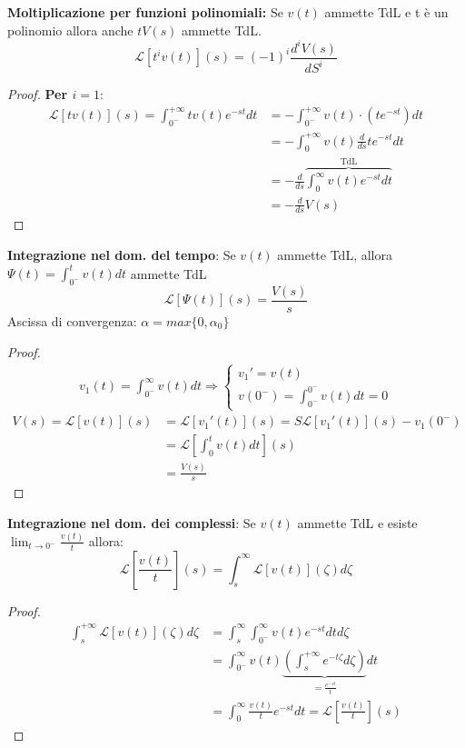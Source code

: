 \documentclass[a4paper]{article}
\begin{document}
\begin{property}
    \label{prop:molt_funz_pol}
    \textbf{Moltiplicazione per funzioni polinomiali:} Se $v(t)$ ammette TdL e t è un polinomio allora anche $tV(s)$ ammette TdL.
    \[\mathcal{L}[t^iv(t)](s) = (-1)^i\frac{d^iV(s)}{dS^i}\]
\end{property}
\begin{proof}
    \textbf{Per $i = 1$}: 
    \begin{align*}
        \mathcal{L}[tv(t)](s) = \int_{0^-}^{+\infty} tv(t)e^{-st}dt &= -\int_{0^-}^{+\infty}v(t) \cdot (te^{-st})dt\\
        &= -\int_{0}^{+\infty} v(t)\frac{d}{ds}te^{-st}dt \\
        &= -\frac{d}{ds}\overbrace{\int_{0}^{\infty}v(t)e^{-st}dt}^{\text{TdL}}\\
        &= -\frac{d}{ds}V(s)
    \end{align*}
\end{proof}
\begin{property}
    \textbf{Integrazione nel dom. del tempo}: Se $v(t)$ ammette TdL, allora $\Psi(t) = \int_{0^-}^{t}v(t)dt$ ammette TdL
    \[\mathcal{L}[\Psi(t)](s) = \frac{V(s)}{s}\]
    Ascissa di convergenza: $\alpha = max\{0, \alpha_0\}$
\end{property}
\begin{proof}
    \begin{align*}
        v_1(t) = \int_{0^-}^{\infty} v(t)dt \Longrightarrow \begin{cases}
            v_1' = v(t)\\
            v(0^-) = \int_{0^-}^{0^-}v(t)dt = 0
        \end{cases}
    \end{align*}
    \begin{align*}
        V(s) = \mathcal{L}[v(t)](s) &= \mathcal{L}[v_1'(t)](s) = S\mathcal{L}[v_1'(t)](s) - v_1(0^-)\\
        &= \mathcal{L}\left[\int_{0}^{t}v(t)dt\right](s)\\ &= \frac{V(s)}{s}
    \end{align*}
\end{proof}
\begin{property}
    \textbf{Integrazione nel dom. dei complessi}: Se $v(t)$ ammette TdL e esiste $\lim_{t \rightarrow 0^-}\frac{v(t)}{t}$
    allora:
    \[\mathcal{L}\left[\frac{v(t)}{t}\right](s) = \int_{s}^{\infty} \mathcal{L}[v(t)](\zeta)d\zeta\]
\end{property}
\begin{proof}
    \begin{align*}
        \int_{s}^{+\infty} \mathcal{L}[v(t)](\zeta)d\zeta &= \int_{s}^{\infty} \int_{0^-}^{\infty} v(t)e^{-st} dtd\zeta\\
        &= \int_{0^-}^{\infty} v(t)\underbrace{\left(\int_{s}^{+\infty}e^{-t\zeta}d\zeta\right)}_{= \frac{e^{-st}}{t}}dt\\
        &= \int_{0}^{\infty}\frac{v(t)}{t}e^{-st}dt = \mathcal{L}\left[\frac{v(t)}{t}\right](s)
    \end{align*}
\end{proof}
\end{document}
